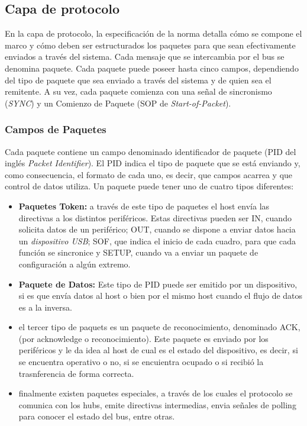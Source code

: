 \subsection{Capa de protocolo}
	En la capa de protocolo, la especificación de la norma detalla cómo se compone el marco y cómo deben ser estructurados los paquetes para que sean efectivamente enviados a través del sistema. Cada mensaje que se intercambia por el bus se denomina paquete. Cada paquete puede poseer hasta cinco campos, dependiendo del tipo de paquete que sea enviado a través del sistema y de quien sea el remitente. A su vez, cada paquete comienza con una señal de sincronismo ({\it SYNC}) y un Comienzo de Paquete (SOP de {\it Start-of-Packet}).\\
	
	\subsubsection*{Campos de Paquetes}
	Cada paquete contiene un campo denominado identificador de paquete (PID del inglés {\it Packet Identifier}). El PID indica el tipo de paquete que se está enviando y, como consecuencia, el formato de cada uno, es decir, que campos acarrea y que control de datos utiliza. Un paquete puede tener uno de cuatro tipos diferentes:
	
	\begin{itemize}
		\item {\bf Paquetes Token:} a través de este tipo de paquetes el host envía las directivas a los distintos periféricos. Estas directivas pueden ser IN, cuando solicita datos de un periférico; OUT, cuando se dispone a enviar datos hacia un {\it dispositivo USB}; SOF, que indica el inicio de cada cuadro, para que cada función se sincronice y SETUP, cuando va a enviar un paquete de configuración a algún extremo.
		\item {\bf Paquete de Datos:} Este tipo de PID puede ser emitido por un dispositivo, si es que envía datos al host o bien por el mismo host cuando el flujo de datos es a la inversa.
		\item el tercer tipo de paquets es un paquete de reconocimiento, denominado ACK, (por acknowledge o reconocimiento). Este paquete es enviado por los periféricos y le da idea al host de cual es el estado del dispositivo, es decir, si se encuentra operativo o no, si se encuientra ocupado o si recibió la trasnferencia de forma correcta.
		\item finalmente existen paquetes especiales, a través de los cuales el protocolo se comunica con los hubs, emite directivas intermedias, envia señales de polling para conocer el estado del bus, entre otras.
	\end{itemize}
	
